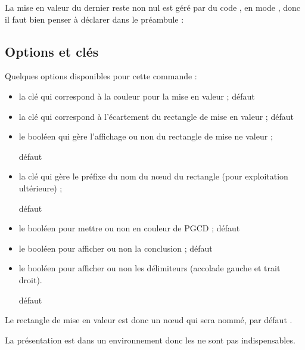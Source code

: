 \begin{warningblock}
La mise en valeur du dernier reste non nul est géré par du code \TikZ, en mode , donc il faut bien penser à déclarer dans le préambule : 
\end{warningblock}

\subsection{Options et clés}

\begin{cautionblock}
Quelques options disponibles pour cette commande :

\begin{itemize}
\item la clé  qui correspond à la couleur pour la mise en valeur ; \hfill{}défaut 
\item la clé  qui correspond à l'écartement du rectangle de mise en valeur ; \hfill{}défaut \Cle{2pt}
\item le booléen  qui gère l'affichage ou non du rectangle de mise ne valeur ;

\hfill{}défaut 
\item la clé  qui gère le préfixe du nom du nœud \TikZ{} du rectangle (pour exploitation ultérieure) ;

\hfill{}défaut 
\item le booléen  pour mettre ou non en couleur de PGCD ; \hfill{}défaut 
\item le booléen  pour afficher ou non la conclusion ; \hfill{}défaut 
\item le booléen  pour afficher ou non les délimiteurs (accolade gauche et trait droit).

\hfill{}défaut 
\end{itemize}

\medskip

Le rectangle de mise en valeur est donc un nœud \TikZ{} qui sera nommé, par défaut .

\medskip

La présentation est dans un environnement  donc les  ne sont pas indispensables.
\end{cautionblock}

\begin{PresCodePL}{}
\end{PresCodePL}

